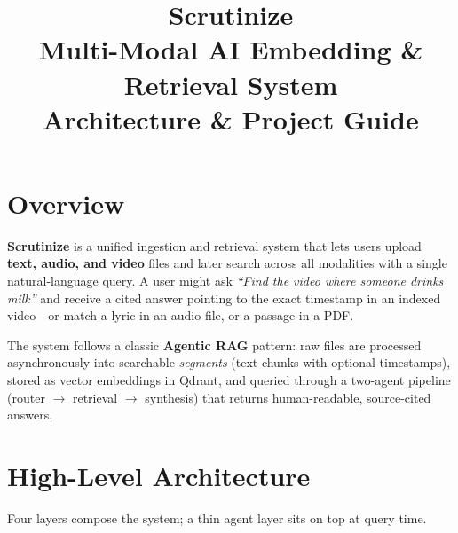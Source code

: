 \documentclass[10pt,a4paper]{article}
\title{\textbf{Scrutinize}\\[0.3em]
\large Multi-Modal AI Embedding \& Retrieval System\\[0.2em]
\normalsize Architecture \& Project Guide}
\author{}
\date{}
\begin{document}
\maketitle
\vspace{-1.5em}

\section{Overview}

\textbf{Scrutinize} is a unified ingestion and retrieval system that lets users upload \textbf{text, audio, and video} files and later search across all modalities with a single natural-language query. A user might ask \emph{``Find the video where someone drinks milk''} and receive a cited answer pointing to the exact timestamp in an indexed video---or match a lyric in an audio file, or a passage in a PDF.

The system follows a classic \textbf{Agentic RAG} pattern: raw files are processed asynchronously into searchable \emph{segments} (text chunks with optional timestamps), stored as vector embeddings in Qdrant, and queried through a two-agent pipeline (router $\rightarrow$ retrieval $\rightarrow$ synthesis) that returns human-readable, source-cited answers.

\section{High-Level Architecture}

Four layers compose the system; a thin agent layer sits on top at query time.
\end{document}

